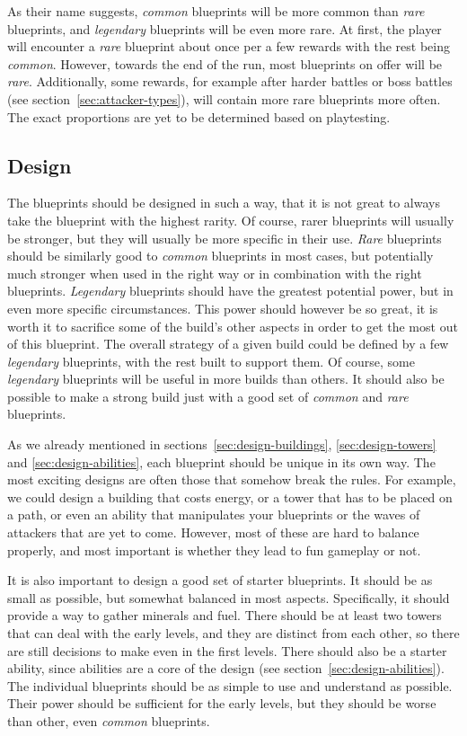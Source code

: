 As their name suggests, \emph{common} blueprints will be more common than \emph{rare} blueprints, and \emph{legendary} blueprints will be even more rare.
At first, the player will encounter a \emph{rare} blueprint about once per a few rewards with the rest being \emph{common}.
However, towards the end of the run, most blueprints on offer will be \emph{rare}.
Additionally, some rewards, for example after harder battles or boss battles (see section~\ref{sec:attacker-types}), will contain more rare blueprints more often.
The exact proportions are yet to be determined based on playtesting.

\subsection{Design}

The blueprints should be designed in such a way, that it is not great to always take the blueprint with the highest rarity.
Of course, rarer blueprints will usually be stronger, but they will usually be more specific in their use.
\emph{Rare} blueprints should be similarly good to \emph{common} blueprints in most cases, but potentially much stronger when used in the right way or in combination with the right blueprints.
\emph{Legendary} blueprints should have the greatest potential power, but in even more specific circumstances.
This power should however be so great, it is worth it to sacrifice some of the build's other aspects in order to get the most out of this blueprint.
The overall strategy of a given build could be defined by a few \emph{legendary} blueprints, with the rest built to support them.
Of course, some \emph{legendary} blueprints will be useful in more builds than others.
It should also be possible to make a strong build just with a good set of \emph{common} and \emph{rare} blueprints.

As we already mentioned in sections~\ref{sec:design-buildings}, \ref{sec:design-towers} and \ref{sec:design-abilities}, each blueprint should be unique in its own way.
The most exciting designs are often those that somehow break the rules.
For example, we could design a building that costs energy, or a tower that has to be placed on a path, or even an ability that manipulates your blueprints or the waves of attackers that are yet to come.
However, most of these are hard to balance properly, and most important is whether they lead to fun gameplay or not.

It is also important to design a good set of starter blueprints.
It should be as small as possible, but somewhat balanced in most aspects.
Specifically, it should provide a way to gather minerals and fuel.
There should be at least two towers that can deal with the early levels, and they are distinct from each other, so there are still decisions to make even in the first levels.
There should also be a starter ability, since abilities are a core of the design (see section~\ref{sec:design-abilities}).
The individual blueprints should be as simple to use and understand as possible.
Their power should be sufficient for the early levels, but they should be worse than other, even \emph{common} blueprints.

